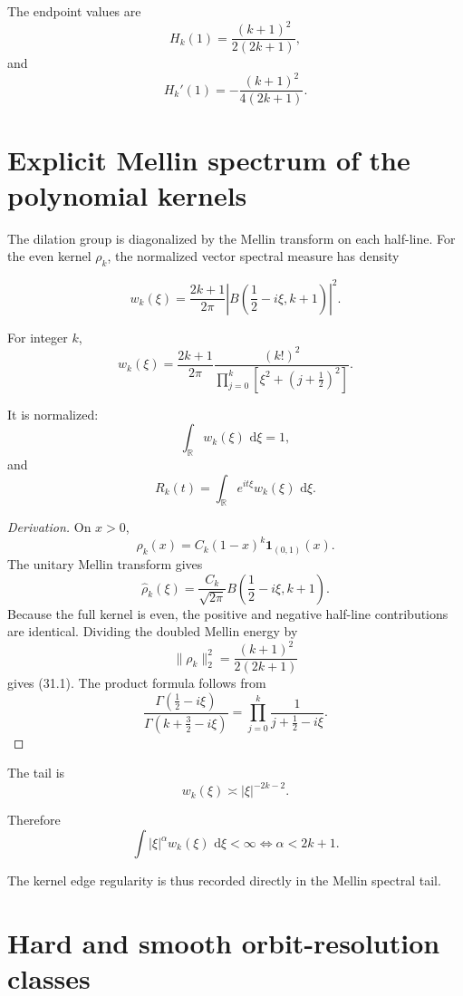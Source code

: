 \documentclass[11pt,a4paper]{article}
\newcommand{\R}{\mathbb R}
\newcommand{\1}{\mathbf 1}
\newcommand{\dd}{\,\mathrm d}
\begin{document}
The endpoint values are
\[
H_k(1)
=
\frac{(k+1)^2}{2(2k+1)},
\tag{30.15}
\]
and
\[
H_k'(1)
=
-\frac{(k+1)^2}{4(2k+1)}.
\tag{30.16}
\]



\section{Explicit Mellin spectrum of the polynomial kernels}

The dilation group is diagonalized by the Mellin transform on each
half-line.
For the even kernel \(\rho_k\), the normalized vector spectral measure
has density

\[
\boxed{
w_k(\xi)
=
\frac{2k+1}{2\pi}
\left|
B\left(\frac12-i\xi,k+1\right)
\right|^2.
}
\tag{31.1}
\]

For integer \(k\),
\[
\boxed{
w_k(\xi)
=
\frac{2k+1}{2\pi}
\frac{(k!)^2}
{\displaystyle
\prod_{j=0}^{k}
\left[
\xi^2+\left(j+\frac12\right)^2
\right]}.
}
\tag{31.2}
\]

It is normalized:
\[
\int_\R w_k(\xi)\,\dd\xi=1,
\tag{31.3}
\]
and
\[
\boxed{
R_k(t)
=
\int_\R e^{it\xi}w_k(\xi)\,\dd\xi.
}
\tag{31.4}
\]

\begin{proof}[Derivation]
On \(x>0\),
\[
\rho_k(x)=C_k(1-x)^k\1_{(0,1)}(x).
\]
The unitary Mellin transform gives
\[
\widehat\rho_k(\xi)
=
\frac{C_k}{\sqrt{2\pi}}
B\left(\frac12-i\xi,k+1\right).
\]
Because the full kernel is even, the positive and negative half-line
contributions are identical.
Dividing the doubled Mellin energy by
\[
\|\rho_k\|_2^2
=
\frac{(k+1)^2}{2(2k+1)}
\]
gives (31.1).
The product formula follows from
\[
\frac{\Gamma(\frac12-i\xi)}
{\Gamma(k+\frac32-i\xi)}
=
\prod_{j=0}^{k}
\frac1{j+\frac12-i\xi}.
\]
\end{proof}

The tail is
\[
\boxed{
w_k(\xi)\asymp|\xi|^{-2k-2}.
}
\tag{31.5}
\]

Therefore
\[
\boxed{
\int|\xi|^\alpha w_k(\xi)\,\dd\xi<\infty
\iff
\alpha<2k+1.
}
\tag{31.6}
\]

The kernel edge regularity is thus recorded directly in the Mellin
spectral tail.


\section{Hard and smooth orbit-resolution classes}
\end{document}
